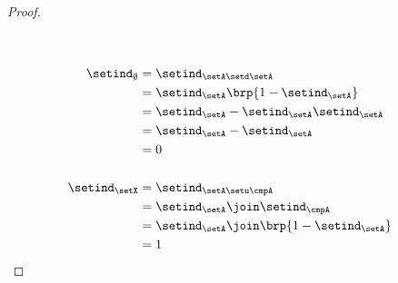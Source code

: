 \begin{proof}
\begin{align*}
  \\
  \\
  \setind_\emptyset
    &= \setind_{\setA\setd\setA}
  \\&= \setind_\setA \brp{1-\setind_\setA}
  \\&= \setind_\setA - \setind_\setA \setind_\setA
  \\&= \setind_\setA - \setind_\setA
  \\&= 0
  \\
  \\
  \setind_\setX
    &= \setind_{\setA\setu\cmpA}
  \\&= \setind_\setA \join \setind_\cmpA
  \\&= \setind_\setA \join \brp{1-\setind_\setA}
  \\&= 1
\end{align*}
\end{proof}

%

